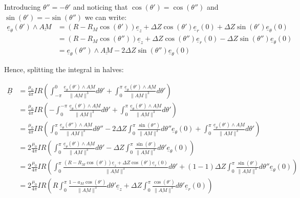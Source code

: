 \documentclass[a4paper,11pt,twoside,titlepage,openright]{book}
\numberwithin{equation}{section}
\newcommand{\ud}[1]{\underline{#1}}
\begin{document}
Introducing $\theta''=-\theta'$
and noticing that $\cos(\theta')=\cos(\theta'')$
and $\sin(\theta')=-\sin(\theta'')$ we can write:
$$
\begin{array}{ll}
    \ud{e}_{\theta}(\theta')\wedge\ud{AM}
    & = (R-R_M\cos(\theta'))\ud{e}_z
    + \Delta Z\cos(\theta')\ud{e}_r(0) + \Delta Z\sin(\theta')\ud{e}_{\theta}(0)\\
    & = (R-R_M\cos(\theta''))\ud{e}_z
    + \Delta Z\cos(\theta'')\ud{e}_r(0) - \Delta Z\sin(\theta'')\ud{e}_{\theta}(0)\\
    & = \ud{e}_{\theta}(\theta'')\wedge\ud{AM} - 2\Delta Z\sin(\theta'')\ud{e}_{\theta}(0)
\end{array}
$$

Hence, splitting the integral in halves:


$$
\begin{array}{ll}
    \ud{B}
    & = \frac{\mu_0}{4\pi}IR\left(
    \int_{-\pi}^{0}
    \frac{\ud{e}_{\theta}(\theta')\wedge\ud{AM}}{\| \ud{AM} \|^3}d\theta'
    + \int_{0}^{\pi}
    \frac{\ud{e}_{\theta}(\theta')\wedge\ud{AM}}{\| \ud{AM} \|^3}d\theta'
    \right)\\
    & = \frac{\mu_0}{4\pi}IR\left(
    -\int_{0}^{-\pi}
    \frac{\ud{e}_{\theta}(\theta')\wedge\ud{AM}}{\| \ud{AM} \|^3}d\theta'
    + \int_{0}^{\pi}
    \frac{\ud{e}_{\theta}(\theta')\wedge\ud{AM}}{\| \ud{AM} \|^3}d\theta'
    \right)\\
    & = \frac{\mu_0}{4\pi}IR\left(
    \int_{0}^{\pi}
    \frac{\ud{e}_{\theta}(\theta'')\wedge\ud{AM}}{\| \ud{AM} \|^3}d\theta''
    - 2\Delta Z\int_{0}^{\pi}\frac{\sin(\theta'')}{\| \ud{AM} \|^3}d\theta''\ud{e}_{\theta}(0)
    + \int_{0}^{\pi}
    \frac{\ud{e}_{\theta}(\theta')\wedge\ud{AM}}{\| \ud{AM} \|^3}d\theta'
    \right)\\
    & = 2\frac{\mu_0}{4\pi}IR\left(
    \int_{0}^{\pi}
    \frac{\ud{e}_{\theta}(\theta')\wedge\ud{AM}}{\| \ud{AM} \|^3}d\theta'
    - \Delta Z\int_{0}^{\pi}\frac{\sin(\theta')}{\| \ud{AM} \|^3}d\theta'\ud{e}_{\theta}(0)
    \right)\\
    & = 2\frac{\mu_0}{4\pi}IR\left(
    \int_{0}^{\pi}
    \frac{(R-R_M\cos(\theta'))\ud{e}_z + \Delta Z\cos(\theta')\ud{e}_r(0)}{\| \ud{AM} \|^3}d\theta'
    + (1-1)\Delta Z\int_{0}^{\pi}\frac{\sin(\theta')}{\| \ud{AM} \|^3}d\theta''\ud{e}_{\theta}(0)
    \right)\\
    & = 2\frac{\mu_0}{4\pi}IR\left(
    R\int_{0}^{\pi}\frac{1-a_M\cos(\theta')}{\| \ud{AM} \|^3}d\theta'\ud{e}_z
    + \Delta Z\int_{0}^{\pi}\frac{\cos(\theta')}{\| \ud{AM} \|^3}d\theta'\ud{e}_r(0)
    \right)\\
\end{array}
$$
\end{document}
